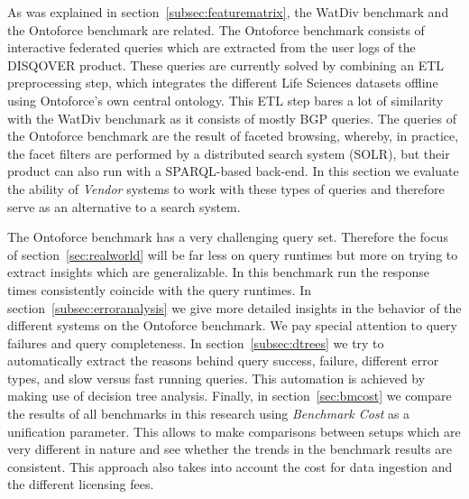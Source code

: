 

As was explained in section~\ref{subsec:featurematrix}, the WatDiv benchmark and the Ontoforce benchmark are related. The Ontoforce benchmark consists of interactive federated queries which are extracted from the user logs of the DISQOVER product. These queries are currently solved by combining an ETL preprocessing step, which integrates the different Life Sciences datasets offline using Ontoforce's own central ontology. This ETL step bares a lot of similarity with the WatDiv benchmark as it consists of mostly BGP queries. The queries of the Ontoforce benchmark are the result of faceted browsing, whereby, in practice, the facet filters are performed by a distributed search system (SOLR), but their product can also run with a SPARQL-based back-end. In this section we evaluate the ability of \emph{Vendor} systems to work with these types of queries and therefore serve as an alternative to a search system.

The Ontoforce benchmark has a very challenging query set. Therefore the focus of section~\ref{sec:realworld} will be far less on query runtimes but more on trying to extract insights which are generalizable. In this benchmark run the response times consistently coincide with the query runtimes.  
In section~\ref{subsec:erroranalysis} we give more detailed insights in the behavior of the different systems on the Ontoforce benchmark. We pay special attention to query failures and query completeness.
In section~\ref{subsec:dtrees} we try to automatically extract the reasons behind query success, failure, different error types, and slow versus fast running queries. This automation is achieved by making use of decision tree analysis.
Finally, in section~\ref{sec:bmcost} we compare the results of all benchmarks in this research using \emph{Benchmark Cost} as a unification parameter. This allows to make comparisons between setups which are very different in nature and see whether the trends in the benchmark results are consistent. This approach also takes into account the cost for data ingestion and the different licensing fees.


